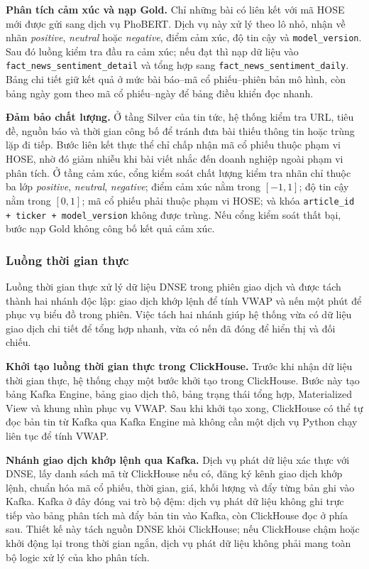 \documentclass[conference,a4paper]{IEEEtran}
\newcommand{\code}[1]{\texttt{#1}}
\begin{document}
\textbf{Phân tích cảm xúc và nạp Gold.} Chỉ những bài có liên kết với mã HOSE mới được gửi sang dịch vụ PhoBERT. Dịch vụ này xử lý theo lô nhỏ, nhận về nhãn \emph{positive}, \emph{neutral} hoặc \emph{negative}, điểm cảm xúc, độ tin cậy và \code{model\_version}. Sau đó luồng kiểm tra đầu ra cảm xúc; nếu đạt thì nạp dữ liệu vào \code{fact\_news\_sentiment\_detail} và tổng hợp sang \code{fact\_news\_sentiment\_daily}. Bảng chi tiết giữ kết quả ở mức bài báo--mã cổ phiếu--phiên bản mô hình, còn bảng ngày gom theo mã cổ phiếu--ngày để bảng điều khiển đọc nhanh.

\textbf{Đảm bảo chất lượng.} Ở tầng Silver của tin tức, hệ thống kiểm tra URL, tiêu đề, nguồn báo và thời gian công bố để tránh đưa bài thiếu thông tin hoặc trùng lặp đi tiếp. Bước liên kết thực thể chỉ chấp nhận mã cổ phiếu thuộc phạm vi HOSE, nhờ đó giảm nhiễu khi bài viết nhắc đến doanh nghiệp ngoài phạm vi phân tích. Ở tầng cảm xúc, cổng kiểm soát chất lượng kiểm tra nhãn chỉ thuộc ba lớp \emph{positive}, \emph{neutral}, \emph{negative}; điểm cảm xúc nằm trong $[-1,1]$; độ tin cậy nằm trong $[0,1]$; mã cổ phiếu phải thuộc phạm vi HOSE; và khóa \code{article\_id + ticker + model\_version} không được trùng. Nếu cổng kiểm soát thất bại, bước nạp Gold không công bố kết quả cảm xúc.

\subsubsection{Luồng thời gian thực}

Luồng thời gian thực xử lý dữ liệu DNSE trong phiên giao dịch và được tách thành hai nhánh độc lập: giao dịch khớp lệnh để tính VWAP và nến một phút để phục vụ biểu đồ trong phiên. Việc tách hai nhánh giúp hệ thống vừa có dữ liệu giao dịch chi tiết để tổng hợp nhanh, vừa có nến đã đóng để hiển thị và đối chiếu.

\textbf{Khởi tạo luồng thời gian thực trong ClickHouse.} Trước khi nhận dữ liệu thời gian thực, hệ thống chạy một bước khởi tạo trong ClickHouse. Bước này tạo bảng Kafka Engine, bảng giao dịch thô, bảng trạng thái tổng hợp, Materialized View và khung nhìn phục vụ VWAP. Sau khi khởi tạo xong, ClickHouse có thể tự đọc bản tin từ Kafka qua Kafka Engine mà không cần một dịch vụ Python chạy liên tục để tính VWAP.

\textbf{Nhánh giao dịch khớp lệnh qua Kafka.} Dịch vụ phát dữ liệu xác thực với DNSE, lấy danh sách mã từ ClickHouse nếu có, đăng ký kênh giao dịch khớp lệnh, chuẩn hóa mã cổ phiếu, thời gian, giá, khối lượng và đẩy từng bản ghi vào Kafka. Kafka ở đây đóng vai trò bộ đệm: dịch vụ phát dữ liệu không ghi trực tiếp vào bảng phân tích mà đẩy bản tin vào Kafka, còn ClickHouse đọc ở phía sau. Thiết kế này tách nguồn DNSE khỏi ClickHouse; nếu ClickHouse chậm hoặc khởi động lại trong thời gian ngắn, dịch vụ phát dữ liệu không phải mang toàn bộ logic xử lý của kho phân tích.
\end{document}
